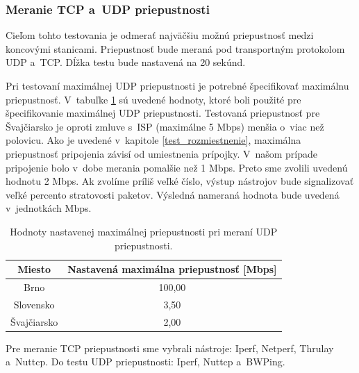        \subsubsection{Meranie TCP a~UDP priepustnosti}
        Cieľom tohto testovania je odmerať najväčšiu možnú priepustnosť medzi
        koncovými stanicami. Priepustnosť bude meraná pod transportným
        protokolom UDP a~TCP. Dĺžka testu bude nastavená na 20 sekúnd. 
        
        Pri
        testovaní maximálnej UDP priepustnosti je potrebné špecifikovať
        maximálnu priepustnosť. V~tabuľke \ref{udp_max_throu} sú uvedené
        hodnoty, ktoré boli použité pre špecifikovanie maximálnej UDP
        priepustnosti. Testovaná priepustnosť pre Švajčiarsko je oproti zmluve
        s~ISP (maximálne 5 Mbps) menšia o~viac než polovicu. Ako je uvedené
        v~kapitole \ref{test_rozmiestnenie}, maximálna priepustnosť pripojenia
        závisí od umiestnenia prípojky. V~našom prípade pripojenie bolo v~dobe 
        merania pomalšie než 1 Mbps. Preto sme zvolili uvedenú hodnotu 2 Mbps.
        Ak zvolíme príliš veľké číslo, výstup
        nástrojov bude signalizovať veľké percento stratovosti paketov.
        Výsledná nameraná hodnota bude uvedená v~jednotkách Mbps.

        \begin{table}[h!]
            \begin{center}
                \begin{tabular}{|c|c|}
                    \hline
                    Miesto & Nastavená maximálna priepustnosť [Mbps] \\  
                    \hline
                    Brno        & 100,00  \\
                    \hline
                    Slovensko   & 3,50   \\
                    \hline
                    Švajčiarsko & 2,00 \\
                    \hline
                \end{tabular}
                \caption{Hodnoty nastavenej maximálnej priepustnosti pri meraní
                UDP priepustnosti.} 
                \label{udp_max_throu}
            \end{center}
        \end{table}
        
        Pre meranie TCP priepustnosti sme vybrali nástroje: Iperf, Netperf,
        Thrulay a~Nuttcp. Do testu UDP priepustnosti: Iperf, Nuttcp a~BWPing.

